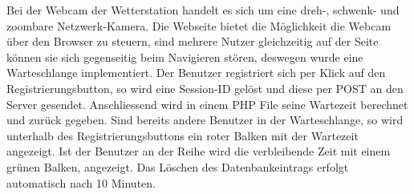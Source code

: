 \documentclass[10pt]{article}
\begin{document}
\begin{multicols}{2}
Bei der Webcam der Wetterstation handelt es sich um eine dreh-, schwenk- und zoombare Netzwerk-Kamera. Die Webseite bietet die Möglichkeit die Webcam über den Browser zu steuern, sind mehrere Nutzer gleichzeitig auf der Seite können sie sich gegenseitig beim Navigieren stören, deswegen wurde eine Warteschlange implementiert. Der Benutzer registriert sich per Klick auf den Registrierungsbutton, so wird eine Session-ID gelöst und diese per POST an den Server gesendet. Anschliessend wird in einem PHP File seine Wartezeit berechnet und zurück gegeben. Sind bereits andere Benutzer in der Warteschlange, so wird unterhalb des Registrierungsbuttons ein roter Balken mit der Wartezeit angezeigt. Ist der Benutzer an der Reihe wird die verbleibende Zeit mit einem grünen Balken, angezeigt. Das Löschen des Datenbankeintrags erfolgt automatisch nach 10 Minuten.
\end{multicols}
 
\end{document}
